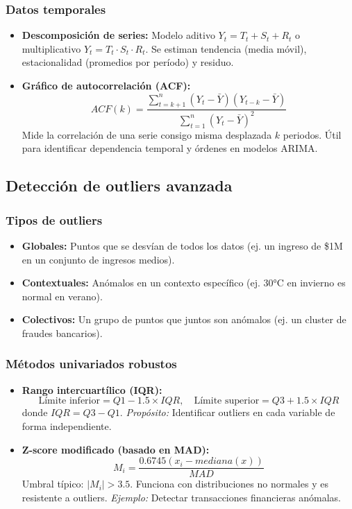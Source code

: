 \documentclass[12pt,a4paper,openany,oneside]{book}
\begin{document}
\subsubsection{Datos temporales}
\begin{itemize}
    \item \textbf{Descomposición de series:} Modelo aditivo $Y_t = T_t + S_t + R_t$ o multiplicativo $Y_t = T_t \cdot S_t \cdot R_t$. Se estiman tendencia (media móvil), estacionalidad (promedios por período) y residuo.
    \item \textbf{Gráfico de autocorrelación (ACF):}
    \[
    ACF(k) = \frac{\sum_{t=k+1}^n (Y_t - \bar{Y})(Y_{t-k} - \bar{Y})}{\sum_{t=1}^n (Y_t - \bar{Y})^2}
    \]
    Mide la correlación de una serie consigo misma desplazada $k$ periodos. Útil para identificar dependencia temporal y órdenes en modelos ARIMA.
\end{itemize}

\subsection{Detección de outliers avanzada}

\subsubsection{Tipos de outliers}
\begin{itemize}
    \item \textbf{Globales:} Puntos que se desvían de todos los datos (ej. un ingreso de \$1M en un conjunto de ingresos medios).
    \item \textbf{Contextuales:} Anómalos en un contexto específico (ej. 30°C en invierno es normal en verano).
    \item \textbf{Colectivos:} Un grupo de puntos que juntos son anómalos (ej. un cluster de fraudes bancarios).
\end{itemize}

\subsubsection{Métodos univariados robustos}
\begin{itemize}
    \item \textbf{Rango intercuartílico (IQR):}
    \[
    \text{Límite inferior} = Q1 - 1.5 \times IQR,\quad \text{Límite superior} = Q3 + 1.5 \times IQR
    \]
    donde $IQR = Q3 - Q1$. \textit{Propósito:} Identificar outliers en cada variable de forma independiente.
    \item \textbf{Z-score modificado (basado en MAD):}
    \[
    M_i = \frac{0.6745(x_i - mediana(x))}{MAD}
    \]
    Umbral típico: $|M_i| > 3.5$. Funciona con distribuciones no normales y es resistente a outliers. \textit{Ejemplo:} Detectar transacciones financieras anómalas.
\end{itemize}
\end{document}
